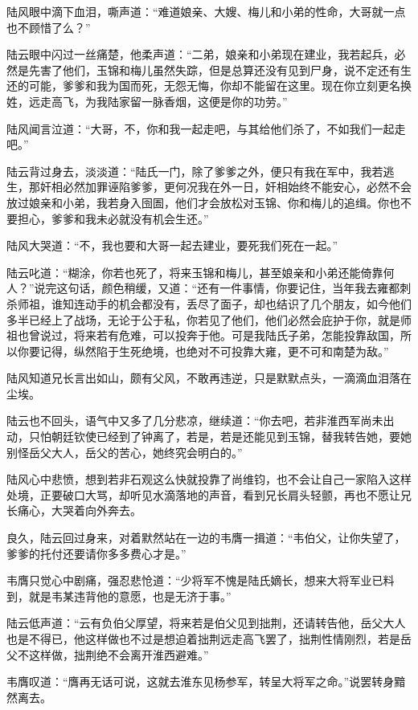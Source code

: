 陆风眼中滴下血泪，嘶声道：“难道娘亲、大嫂、梅儿和小弟的性命，大哥就一点也不顾惜了么？”

陆云眼中闪过一丝痛楚，他柔声道：“二弟，娘亲和小弟现在建业，我若起兵，必然是先害了他们，玉锦和梅儿虽然失踪，但是总算还没有见到尸身，说不定还有生还的可能，爹爹和我为国而死，无怨无悔，你却不能留在这里。现在你立刻更名换姓，远走高飞，为我陆家留一脉香烟，这便是你的功劳。”

陆风闻言泣道：“大哥，不，你和我一起走吧，与其给他们杀了，不如我们一起走吧。”

陆云背过身去，淡淡道：“陆氏一门，除了爹爹之外，便只有我在军中，我若逃生，那奸相必然加罪诬陷爹爹，更何况我在外一日，奸相始终不能安心，必然不会放过娘亲和小弟，我若身入囹圄，他们才会放松对玉锦、你和梅儿的追缉。你也不要担心，爹爹和我未必就没有机会生还。”

陆风大哭道：“不，我也要和大哥一起去建业，要死我们死在一起。”

陆云叱道：“糊涂，你若也死了，将来玉锦和梅儿，甚至娘亲和小弟还能倚靠何人？”说完这句话，颜色稍缓，又道：“还有一件事情，你要记住，当年我去雍都刺杀师祖，谁知连动手的机会都没有，丢尽了面子，却也结识了几个朋友，如今他们多半已经上了战场，无论于公于私，你若见了他们，他们必然会庇护于你，就是师祖也曾说过，将来若有危难，可以投奔于他。可是我陆氏子弟，怎能投靠敌国，所以你要记得，纵然陷于生死绝境，也绝对不可投靠大雍，更不可和南楚为敌。”

陆风知道兄长言出如山，颇有父风，不敢再违逆，只是默默点头，一滴滴血泪落在尘埃。

陆云也不回头，语气中又多了几分悲凉，继续道：“你去吧，若非淮西军尚未出动，只怕朝廷钦使已经到了钟离了，若是，若是还能见到玉锦，替我转告她，要她别怪岳父大人，岳父的苦心，她终究会明白的。”

陆风心中悲愤，想到若非石观这么快就投靠了尚维钧，也不会让自己一家陷入这样处境，正要破口大骂，却听见水滴落地的声音，看到兄长肩头轻颤，再也不愿让兄长痛心，大哭着向外奔去。

良久，陆云回过身来，对着默然站在一边的韦膺一揖道：“韦伯父，让你失望了，爹爹的托付还要请你多多费心才是。”

韦膺只觉心中剧痛，强忍悲怆道：“少将军不愧是陆氏嫡长，想来大将军业已料到，就是韦某违背他的意愿，也是无济于事。”

陆云低声道：“云有负伯父厚望，将来若是伯父见到拙荆，还请转告他，岳父大人也是不得已，他这样做也不过是想迫着拙荆远走高飞罢了，拙荆性情刚烈，若是岳父不这样做，拙荆绝不会离开淮西避难。”

韦膺叹道：“膺再无话可说，这就去淮东见杨参军，转呈大将军之命。”说罢转身黯然离去。

